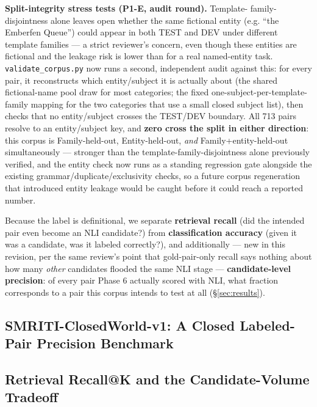\textbf{Split-integrity stress tests (P1-E, audit round).} Template-
family-disjointness alone leaves open whether the same fictional
entity (e.g. ``the Emberfen Queue'') could appear in both TEST and DEV
under different template families --- a strict reviewer's concern, even
though these entities are fictional and the leakage risk is lower than
for a real named-entity task. \texttt{validate\_corpus.py} now runs a
second, independent audit against this: for every pair, it reconstructs
which entity/subject it is actually about (the shared fictional-name
pool draw for most categories; the fixed one-subject-per-template-family
mapping for the two categories that use a small closed subject list),
then checks that no entity/subject crosses the TEST/DEV boundary. All
713 pairs resolve to an entity/subject key, and \textbf{zero cross the
split in either direction}: this corpus is Family-held-out,
Entity-held-out, \emph{and} Family+entity-held-out simultaneously ---
stronger than the template-family-disjointness alone previously
verified, and the entity check now runs as a standing regression gate
alongside the existing grammar/duplicate/exclusivity checks, so a future
corpus regeneration that introduced entity leakage would be caught
before it could reach a reported number.

Because the label is definitional, we separate \textbf{retrieval recall}
(did the intended pair even become an NLI candidate?) from
\textbf{classification accuracy} (given it was a candidate, was it
labeled correctly?), and additionally --- new in this revision, per the
same review's point that gold-pair-only recall says nothing about how
many \emph{other} candidates flooded the same NLI stage ---
\textbf{candidate-level precision}: of every pair Phase 6 actually
scored with NLI, what fraction corresponds to a pair this corpus intends
to test at all (\S\ref{sec:results}).



\subsection{SMRITI-ClosedWorld-v1: A Closed Labeled-Pair Precision Benchmark}
\label{sec:closed-world}


\subsection{Retrieval Recall@K and the Candidate-Volume Tradeoff}
\label{sec:recall-at-k}

